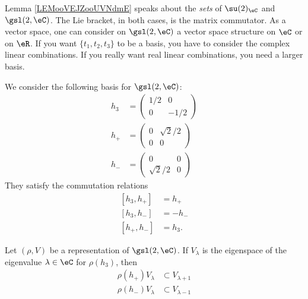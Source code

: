 \begin{normaltext}
    Lemma \ref{LEMooVEJZooUVNdmE} speaks about the \emph{sets} of \( \su(2)_{\eC}\) and \( \gsl(2,\eC)\). The Lie bracket, in both cases, is the matrix commutator. As a vector space, one can consider on \( \gsl(2,\eC)\) a vector space structure on \( \eC\) or on \( \eR\). If you want \( \{ t_1, t_2, t_3 \}\) to be a basis, you have to consider the complex linear combinations. If you really want real linear combinations, you need a larger basis.
\end{normaltext}

We consider the following basis for \( \gsl(2,\eC)\):
\begin{subequations}
    \begin{align}
        h_3&=\begin{pmatrix}
            1/2    &   0    \\ 
            0    &   -1/2    
        \end{pmatrix}\\
        h_+&=\begin{pmatrix}
            0    &   \sqrt{ 2 }/2    \\ 
            0    &   0    
        \end{pmatrix}\\
        h_-&=\begin{pmatrix}
            0    &   0    \\ 
            \sqrt{ 2 }/2    &   0    
        \end{pmatrix}
    \end{align}
\end{subequations}
They satisfy the commutation relations
\begin{subequations}
    \begin{align}
        [h_3,h_+]&=h_+\\
        [h_3,h_-]&=-h_-\\
        [h_+,h_-]&=h_3.
    \end{align}
\end{subequations}

\begin{lemma}     \label{LEMooDGUYooPUkDNr}
    Let \( (\rho, V)\) be a representation of \( \gsl(2,\eC)\). If \( V_{\lambda}\) is the eigenspace of the eigenvalue \( \lambda\in \eC\) for \( \rho(h_3)\), then
    \begin{subequations}
        \begin{align}
            \rho(h_+)V_{\lambda}&\subset V_{\lambda+1}\\
            \rho(h_-)V_{\lambda}&\subset V_{\lambda-1}
        \end{align}
    \end{subequations}
\end{lemma}

